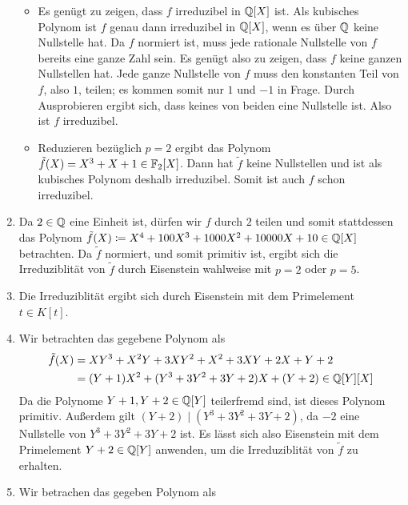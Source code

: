 \begin{solution}
\begin{enumerate}
      \begin{itemize}
        \item
          Es genügt zu zeigen, dass $f$ irreduzibel in $\mathbb{Q}[X]$ ist.
          Als kubisches Polynom ist $f$ genau dann irreduzibel in $\mathbb{Q}[X]$, wenn es über $\mathbb{Q}$ keine Nullstelle hat.
          Da $f$ normiert ist, muss jede rationale Nullstelle von $f$ bereits eine ganze Zahl sein.
          Es genügt also zu zeigen, dass $f$ keine ganzen Nullstellen hat.
          Jede ganze Nullstelle von $f$ muss den konstanten Teil von $f$, also $1$, teilen;
          es kommen somit nur $1$ und $-1$ in Frage.
          Durch Ausprobieren ergibt sich, dass keines von beiden eine Nullstelle ist.
          Also ist $f$ irreduzibel.
        \item
          Reduzieren bezüglich $p = 2$ ergibt das Polynom $\tilde{f}(X) = X^3 + X + 1 \in \mathbb{F}_2[X]$.
          Dann hat $\tilde{f}$ keine Nullstellen und ist als kubisches Polynom deshalb irreduzibel.
          Somit ist auch $f$ schon irreduzibel.
      \end{itemize}
    \item
      Da $2 \in \mathbb{Q}$ eine Einheit ist, dürfen wir $f$ durch $2$ teilen und somit stattdessen das Polynom $\tilde{f}(X) \coloneqq X^4 + 100 X^3 + 1000 X^2 + 10000 X + 10 \in \mathbb{Q}[X]$ betrachten.
      Da $\tilde{f}$ normiert, und somit primitiv ist, ergibt sich die Irreduziblität von $\tilde{f}$ durch Eisenstein wahlweise mit $p = 2$ oder $p = 5$.
    \item
      Die Irreduziblität ergibt sich durch Eisenstein mit dem Primelement $t \in K[t]$.
    \item
      Wir betrachten das gegebene Polynom als
      \begin{align*}
            \tilde{f}(X)
        &=  X Y^3 + X^2 Y + 3 X Y^2 + X^2 + 3 X Y + 2 X + Y + 2
        \\
        &=  (Y + 1) X^2 + (Y^3 + 3 Y^2 + 3 Y + 2) X + (Y + 2)
        \in \mathbb{Q}[Y][X]
      \end{align*}
      Da die Polynome $Y+1, Y + 2 \in \mathbb{Q}[Y]$ teilerfremd sind, ist dieses Polynom primitiv.
      Außerdem gilt $(Y + 2) \mid (Y^3 + 3 Y^2 + 3 Y + 2)$, da $-2$ eine Nullstelle von $Y^3 + 3 Y^2 + 3 Y + 2$ ist.
      Es lässt sich also Eisenstein mit dem Primelement $Y + 2 \in \mathbb{Q}[Y]$ anwenden, um die Irreduziblität von $\tilde{f}$ zu erhalten.
    \item
      Wir betrachen das gegeben Polynom als
      \begin{align*}

\end{align*}
\end{enumerate}
\end{solution}

